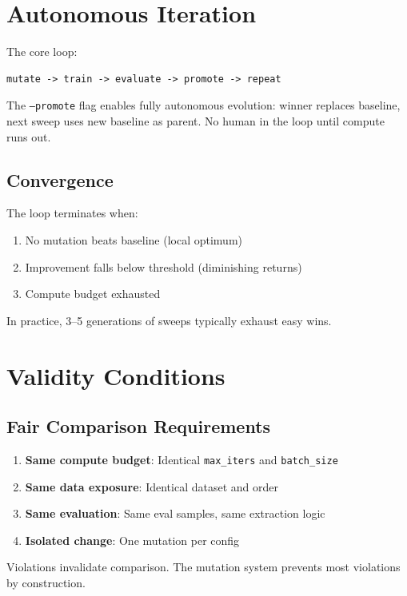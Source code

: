 \documentclass{article}
\begin{document}
\section{Autonomous Iteration}

The core loop:

\begin{lstlisting}
mutate -> train -> evaluate -> promote -> repeat
\end{lstlisting}

The \texttt{--promote} flag enables fully autonomous evolution: winner replaces baseline, next sweep uses new baseline as parent. No human in the loop until compute runs out.

\subsection{Convergence}

The loop terminates when:
\begin{enumerate}
  \item No mutation beats baseline (local optimum)
  \item Improvement falls below threshold (diminishing returns)
  \item Compute budget exhausted
\end{enumerate}

In practice, 3--5 generations of sweeps typically exhaust easy wins.

\section{Validity Conditions}

\subsection{Fair Comparison Requirements}

\begin{enumerate}
  \item \textbf{Same compute budget}: Identical \texttt{max\_iters} and \texttt{batch\_size}
  \item \textbf{Same data exposure}: Identical dataset and order
  \item \textbf{Same evaluation}: Same eval samples, same extraction logic
  \item \textbf{Isolated change}: One mutation per config
\end{enumerate}

Violations invalidate comparison. The mutation system prevents most violations by construction.
\end{document}
